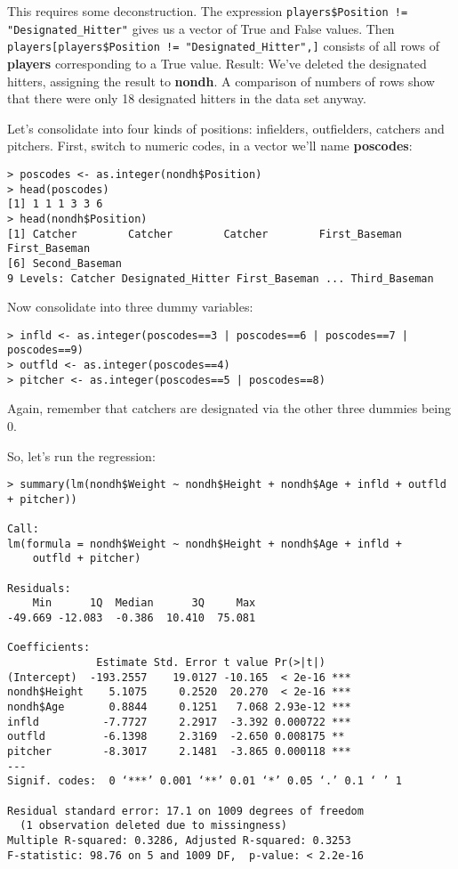 This requires some deconstruction.  The expression
\lstinline{players$Position != "Designated_Hitter"} gives us a vector of
True and False values.  Then
\lstinline{players[players$Position != "Designated_Hitter",]} consists
of all rows of {\bf players} corresponding to a True value.  Result:
We've deleted the designated hitters, assigning the result to {\bf
nondh}.  A comparison of numbers of rows show that there were only 18
designated hitters in the data set anyway.

Let's consolidate into four kinds of positions:  infielders,
outfielders, catchers and pitchers.  First, switch to numeric codes, in
a vector we'll name {\bf poscodes}:

\begin{lstlisting}
> poscodes <- as.integer(nondh$Position)
> head(poscodes)
[1] 1 1 1 3 3 6
> head(nondh$Position)
[1] Catcher        Catcher        Catcher        First_Baseman  First_Baseman 
[6] Second_Baseman
9 Levels: Catcher Designated_Hitter First_Baseman ... Third_Baseman
\end{lstlisting}

Now consolidate into three dummy variables:

\begin{lstlisting}
> infld <- as.integer(poscodes==3 | poscodes==6 | poscodes==7 | poscodes==9)
> outfld <- as.integer(poscodes==4)
> pitcher <- as.integer(poscodes==5 | poscodes==8)
\end{lstlisting}

Again, remember that catchers are designated via the other three dummies
being 0.

So, let's run the regression:

\begin{lstlisting}
> summary(lm(nondh$Weight ~ nondh$Height + nondh$Age + infld + outfld + pitcher))

Call:
lm(formula = nondh$Weight ~ nondh$Height + nondh$Age + infld + 
    outfld + pitcher)

Residuals:
    Min      1Q  Median      3Q     Max 
-49.669 -12.083  -0.386  10.410  75.081 

Coefficients:
              Estimate Std. Error t value Pr(>|t|)    
(Intercept)  -193.2557    19.0127 -10.165  < 2e-16 ***
nondh$Height    5.1075     0.2520  20.270  < 2e-16 ***
nondh$Age       0.8844     0.1251   7.068 2.93e-12 ***
infld          -7.7727     2.2917  -3.392 0.000722 ***
outfld         -6.1398     2.3169  -2.650 0.008175 ** 
pitcher        -8.3017     2.1481  -3.865 0.000118 ***
---
Signif. codes:  0 ‘***’ 0.001 ‘**’ 0.01 ‘*’ 0.05 ‘.’ 0.1 ‘ ’ 1 

Residual standard error: 17.1 on 1009 degrees of freedom
  (1 observation deleted due to missingness)
Multiple R-squared: 0.3286,	Adjusted R-squared: 0.3253 
F-statistic: 98.76 on 5 and 1009 DF,  p-value: < 2.2e-16 
\end{lstlisting}

